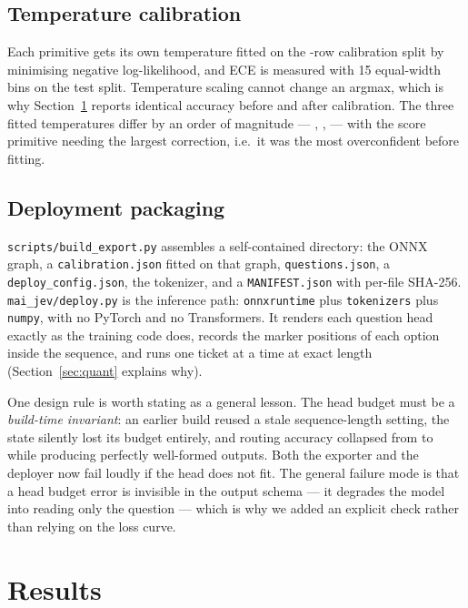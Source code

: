 \documentclass[11pt,a4paper]{article}
\begin{document}
\subsection{Temperature calibration}

Each primitive gets its own temperature fitted on the \RowsCalib{}-row calibration split by minimising negative log-likelihood, and ECE is measured with 15 equal-width bins on the test split. Temperature scaling cannot change an argmax, which is why Section~\ref{sec:results} reports identical accuracy before and after calibration. The three fitted temperatures differ by an order of magnitude --- \TChoice, \TScore, \TNoul{} --- with the score primitive needing the largest correction, i.e.\ it was the most overconfident before fitting.

\subsection{Deployment packaging}

\texttt{scripts/build\_export.py} assembles a self-contained directory: the ONNX graph, a \texttt{calibration.json} fitted on that graph, \texttt{questions.json}, a \texttt{deploy\_config.json}, the tokenizer, and a \texttt{MANIFEST.json} with per-file SHA-256. \texttt{mai\_jev/deploy.py} is the inference path: \texttt{onnxruntime} plus \texttt{tokenizers} plus \texttt{numpy}, with no PyTorch and no Transformers. It renders each question head exactly as the training code does, records the marker positions of each option inside the sequence, and runs one ticket at a time at exact length (Section~\ref{sec:quant} explains why).

One design rule is worth stating as a general lesson. The head budget must be a \emph{build-time invariant}: an earlier build reused a stale sequence-length setting, the state silently lost its budget entirely, and routing accuracy collapsed from \AccChoice{} to \AccCollapsed{} while producing perfectly well-formed outputs. Both the exporter and the deployer now fail loudly if the head does not fit. The general failure mode is that a head budget error is invisible in the output schema --- it degrades the model into reading only the question --- which is why we added an explicit check rather than relying on the loss curve.

\section{Results}
\label{sec:results}
\end{document}
